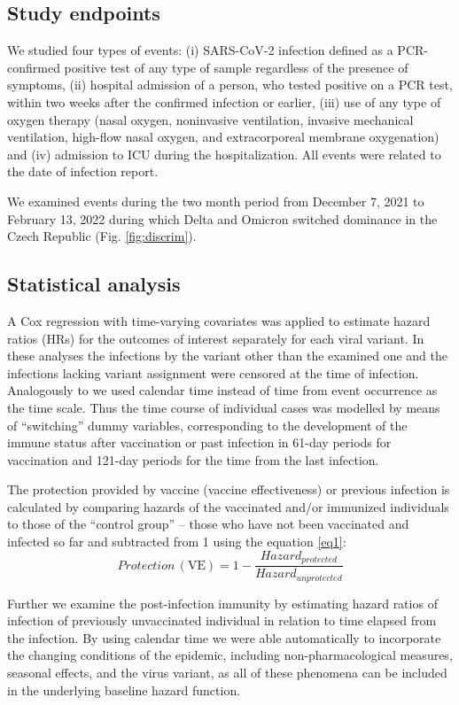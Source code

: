 \documentclass[9pt,twocolumn,twoside,lineno]{pnas-new}
\begin{document}
\subsection*{Study endpoints}

We studied four types of events: (i) SARS-CoV-2 infection defined as a PCR-confirmed positive test of any type of sample regardless of the presence of symptoms, (ii) hospital admission of a person, who tested positive on a PCR test, within two weeks after the confirmed infection or earlier, (iii) use of any type of oxygen therapy (nasal oxygen, noninvasive ventilation, invasive mechanical ventilation, high-flow nasal oxygen, and extracorporeal membrane oxygenation) and (iv) admission to ICU during the hospitalization. All events were related to the date of infection report.

We examined events during the two month period from December 7, 2021 to February 13, 2022 during which Delta and Omicron switched dominance in the Czech Republic (Fig. \ref{fig:discrim}). 

\subsection*{Statistical analysis}
A Cox regression with time-varying covariates was applied to estimate hazard ratios (HRs) for the outcomes of interest separately for each viral variant. In these analyses the infections by the variant other than the examined one and the infections lacking variant assignment were censored at the time of infection. Analogously to \citep{tartof2021effectiveness} we used calendar time instead of time from event occurrence as the time scale. Thus the time course of individual cases was modelled by means of ``switching'' dummy variables, corresponding to the development of the immune status after vaccination or past infection in 61-day periods for vaccination and 121-day periods for the time from the last infection.

The protection provided by vaccine (vaccine effectiveness) or previous infection is calculated by comparing hazards of the vaccinated and/or immunized individuals to those of the  ``control group'' -- those who have not been vaccinated and infected so far and subtracted from 1 using the equation \ref{eq1}:
\begin{equation}
Protection\, (\mbox{VE}) = 1 - \frac{Hazard_{protected}}{Hazard_{unprotected}}
\label{eq1}
\end{equation}

Further we examine the post-infection immunity by estimating hazard ratios of infection of previously unvaccinated individual in relation to time elapsed from the infection. By using calendar time we were able automatically to incorporate the changing conditions of the epidemic, including non-pharmacological measures, seasonal effects, and the  virus variant, as all of these phenomena can be included in the underlying baseline hazard function. 
\end{document}
